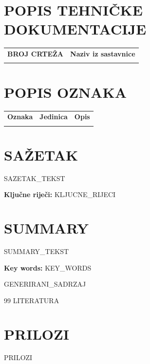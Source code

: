 \documentclass[12pt,a4paper]{article}
\begin{document}

\tableofcontents
\newpage
\listoffigures
\newpage
\listoftables
\newpage

\section*{POPIS TEHNIČKE DOKUMENTACIJE}
\begin{tabularx}{\textwidth}{>{\raggedright\arraybackslash}p{}X}
\textbf{BROJ CRTEŽA} & \textbf{Naziv iz sastavnice} \\
{{POPIS_TEHNICKE_DOKUMENTACIJE}} & \\
\end{tabularx}

\newpage
\section*{POPIS OZNAKA}
\begin{tabularx}{\textwidth}{>{\raggedright\arraybackslash}p{}>{\raggedright\arraybackslash}p{}X}
\textbf{Oznaka} & \textbf{Jedinica} & \textbf{Opis} \\
{{POPIS_OZNAKA}} & & \\
\end{tabularx}

\newpage
\section*{SAŽETAK}
{{SAZETAK_TEKST}}

\vspace{0.75cm}
\noindent \textbf{Ključne riječi:} {{KLJUCNE_RIJECI}}

\newpage
\section*{SUMMARY}
{{SUMMARY_TEKST}}

\vspace{0.75cm}
\noindent \textbf{Key words:} {{KEY_WORDS}}

\newpage
{}

{{GENERIRANI_SADRZAJ}}

\newpage
\begin{thebibliography}{99}
{{LITERATURA}}
\end{thebibliography}

\appendix
\section{PRILOZI}
{{PRILOZI}}
\end{document}
